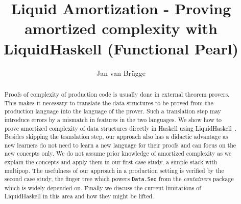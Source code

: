 \documentclass[sigplan,screen]{acmart}
\begin{document}
\title{Liquid Amortization - Proving amortized complexity with LiquidHaskell (Functional Pearl)}

\author{Jan van Brügge}


\begin{abstract}
Proofs of complexity of production code is usually done in external theorem provers. This makes it necessary to translate the data structures to be proved from the production language into the language of the prover. Such a translation step may introduce errors by a mismatch in features in the two languages. We show how to prove amortized complexity of data structures directly in Haskell using LiquidHaskell~\cite{liquidhaskell}. Besides skipping the translation step, our approach also has a didactic advantage as new learners do not need to learn a new language for their proofs and can focus on the new concepts only. We do not assume prior knowledge of amortized complexity as we explain the concepts and apply them in our first case study, a simple stack with multipop. The usefulness of our approach in a production setting is verified by the second case study, the finger tree which powers \texttt{Data.Seq} from the \textit{containers} package which is widely depended on. Finally we discuss the current limitations of LiquidHaskell in this area and how they might be lifted.
\end{abstract}
\end{document}
